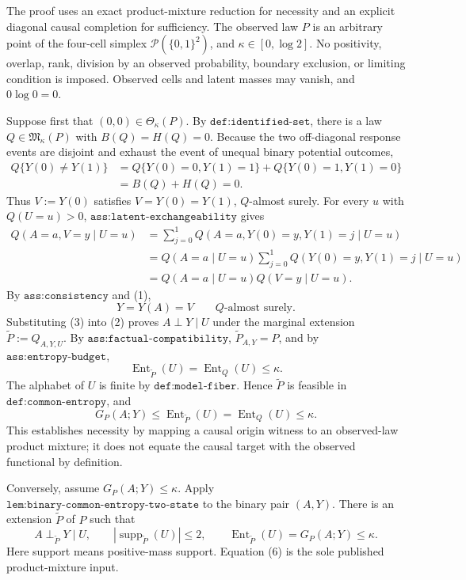 The proof uses an exact product-mixture reduction for necessity and an explicit diagonal causal completion for sufficiency. The observed law \(P\) is an arbitrary point of the four-cell simplex \(\mathcal P(\{0,1\}^2)\), and \(\kappa\in[0,\log2]\). No positivity, overlap, rank, division by an observed probability, boundary exclusion, or limiting condition is imposed. Observed cells and latent masses may vanish, and \(0\log0=0\).

Suppose first that \((0,0)\in\Theta_\kappa(P)\). By \(\texttt{def:identified-set}\), there is a law \(Q\in\mathfrak M_\kappa(P)\) with \(B(Q)=H(Q)=0\). Because the two off-diagonal response events are disjoint and exhaust the event of unequal binary potential outcomes,
\[
\begin{aligned}
Q\{Y(0)\neq Y(1)\}
&=Q\{Y(0)=0,Y(1)=1\}+Q\{Y(0)=1,Y(1)=0\}\\
&=B(Q)+H(Q)=0.
\end{aligned}
\tag{1}
\]
Thus \(V:=Y(0)\) satisfies \(V=Y(0)=Y(1)\), \(Q\)-almost surely. For every \(u\) with \(Q(U=u)>0\), \(\texttt{ass:latent-exchangeability}\) gives
\[
\begin{aligned}
Q(A=a,V=y\mid U=u)
&=\sum_{j=0}^1 Q(A=a,Y(0)=y,Y(1)=j\mid U=u)\\
&=Q(A=a\mid U=u)
  \sum_{j=0}^1Q(Y(0)=y,Y(1)=j\mid U=u)\\
&=Q(A=a\mid U=u)Q(V=y\mid U=u).
\end{aligned}
\tag{2}
\]
By \(\texttt{ass:consistency}\) and (1),
\[
Y=Y(A)=V\qquad Q\text{-almost surely}.
\tag{3}
\]
Substituting (3) into (2) proves \(A\perp Y\mid U\) under the marginal extension \(\widetilde P:=Q_{A,Y,U}\). By \(\texttt{ass:factual-compatibility}\), \(\widetilde P_{A,Y}=P\), and by \(\texttt{ass:entropy-budget}\),
\[
\operatorname{Ent}_{\widetilde P}(U)=\operatorname{Ent}_Q(U)\leq\kappa.
\tag{4}
\]
The alphabet of \(U\) is finite by \(\texttt{def:model-fiber}\). Hence \(\widetilde P\) is feasible in \(\texttt{def:common-entropy}\), and
\[
G_P(A;Y)\leq\operatorname{Ent}_{\widetilde P}(U)
=\operatorname{Ent}_Q(U)\leq\kappa.
\tag{5}
\]
This establishes necessity by mapping a causal origin witness to an observed-law product mixture; it does not equate the causal target with the observed functional by definition.

Conversely, assume \(G_P(A;Y)\leq\kappa\). Apply \(\texttt{lem:binary-common-entropy-two-state}\) to the binary pair \((A,Y)\). There is an extension \(\widetilde P\) of \(P\) such that
\[
A\perp_{\widetilde P}Y\mid U,
\qquad
|\operatorname{supp}_{\widetilde P}(U)|\leq2,
\qquad
\operatorname{Ent}_{\widetilde P}(U)=G_P(A;Y)\leq\kappa.
\tag{6}
\]
Here support means positive-mass support. Equation (6) is the sole published product-mixture input.

